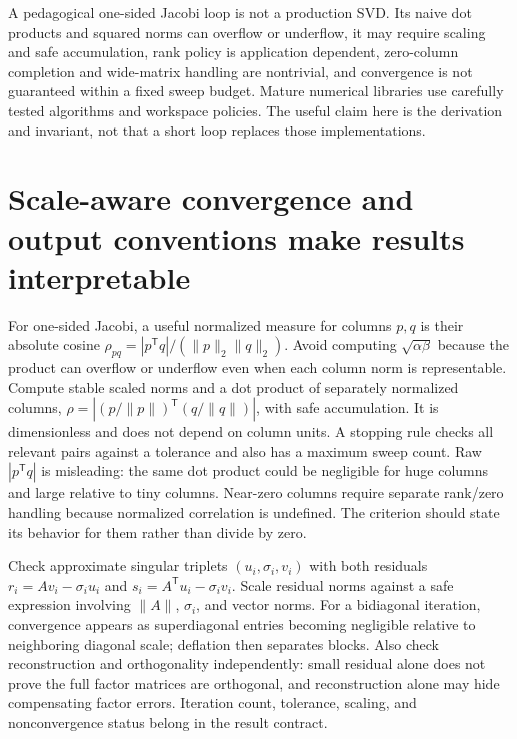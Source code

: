 A pedagogical one-sided Jacobi loop is not a production SVD. Its naive dot products and squared norms can overflow or underflow, it may require scaling and safe accumulation, rank policy is application dependent, zero-column completion and wide-matrix handling are nontrivial, and convergence is not guaranteed within a fixed sweep budget. Mature numerical libraries use carefully tested algorithms and workspace policies. The useful claim here is the derivation and invariant, not that a short loop replaces those implementations.

\section{Scale-aware convergence and output conventions make results interpretable}\label{02-foundations-ii-ch038-scale-aware-convergence-and-output-conventions-make-results-interpretable}

For one-sided Jacobi, a useful normalized measure for columns \(p,q\) is their absolute cosine \(\rho_{pq}=|p^\mathsf Tq|/(\|p\|_2\|q\|_2)\). Avoid computing \(\sqrt{\alpha\beta}\) because the product can overflow or underflow even when each column norm is representable. Compute stable scaled norms and a dot product of separately normalized columns, \(\rho=|(p/\|p\|)^\mathsf T(q/\|q\|)|\), with safe accumulation. It is dimensionless and does not depend on column units. A stopping rule checks all relevant pairs against a tolerance and also has a maximum sweep count. Raw \(|p^\mathsf Tq|\) is misleading: the same dot product could be negligible for huge columns and large relative to tiny columns. Near-zero columns require separate rank/zero handling because normalized correlation is undefined. The criterion should state its behavior for them rather than divide by zero.

Check approximate singular triplets \((u_i,\sigma_i,v_i)\) with both residuals \(r_i=Av_i-\sigma_i u_i\) and \(s_i=A^\mathsf Tu_i-\sigma_i v_i\). Scale residual norms against a safe expression involving \(\|A\|\), \(\sigma_i\), and vector norms. For a bidiagonal iteration, convergence appears as superdiagonal entries becoming negligible relative to neighboring diagonal scale; deflation then separates blocks. Also check reconstruction and orthogonality independently: small residual alone does not prove the full factor matrices are orthogonal, and reconstruction alone may hide compensating factor errors. Iteration count, tolerance, scaling, and nonconvergence status belong in the result contract.

